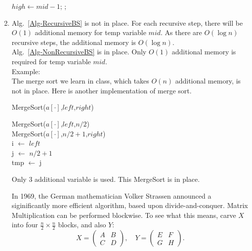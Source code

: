 \documentclass[12pt,a4paper]{article}
\makeatletter
\newtheorem*{solution}{Solution}
\theoremstyle{definition}
\renewenvironment{solution}[1][Solution] {\par\pushQED{\qed}\normalfont\topsep6\p@\@plus6\p@\relax\trivlist\item[\hskip\labelsep\bfseries#1\@addpunct{.}]\ignorespaces}{\popQED\endtrivlist\@endpefalse} \makeatother
\makeatother
\begin{document}
\begin{enumerate}
\begin{minipage}[t]{0.455\textwidth}
\begin{algorithm}[H]
{	
	{
		$high \leftarrow mid - 1$;
	}
	}
	;
\end{algorithm}\end{minipage}
\begin{solution}
	Alg.~\ref{Alg-RecursiveBS} is not in place. For each recursive step, there will be $O(1)$ additional memory for temp variable $mid$. As there are $O(\log n)$ recursive steps, the additional memory is $O(\log n)$. \\
	Alg.~\ref{Alg-NonRecursiveBS} is in place. Only $O(1)$ additional memory is required for temp variable $mid$. \\
	Example: \\
	The merge sort we learn in class, which takes $O(n)$ additional memory, is not in place.
	Here is another implementation of merge sort. \\
	\begin{algorithm}[H]
		\BlankLine
    	\caption{MergeSort($a[\cdot]$,$left$,$right$)} \label{merge}
    	\BlankLine
		MergeSort($a[\cdot]$,$left$,$n/2$) \\
		MergeSort($a[\cdot]$,$n/2+1$,$right$) \\
		i $\gets $ $left$ \\
		j $\gets$ $n/2+1$ \\
		tmp $\gets$ j \\
	\end{algorithm}
	Only 3 additional variable is used. This MergeSort is in place.
\end{solution}



In 1969, the German mathematician Volker Strassen announced a siginificantly more efficient algorithm, based upon divide-and-conquer. Matrix Multiplication can be performed blockwise. To see what this means, carve $X$ into four $\frac{n}{2} \times \frac{n}{2}$ blocks, and also $Y$:
\begin{displaymath}
X=
\left(\begin{array}{c|c}
A & B \\
\hline
C & D \end{array}\right), \quad
Y=\left(\begin{array}{c|c}
E & F \\
\hline
G & H \end{array}\right).
 \end{displaymath}


\end{enumerate}
\end{document}

